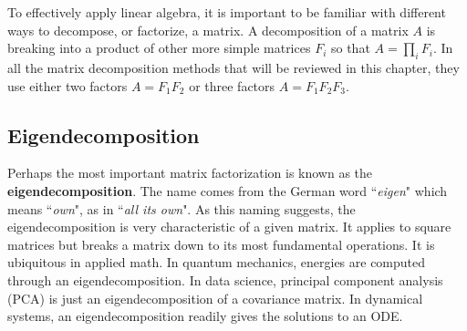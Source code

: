 \documentclass[onecolumn]{gwclass}
\begin{document}
To effectively apply linear algebra, it is important to be familiar with different ways to decompose, or factorize, a matrix. A decomposition of a matrix $A$ is breaking into a product of other more simple matrices $F_i$ so that $A=\prod_i F_i$. In all the matrix decomposition methods that will be reviewed in this chapter, they use either two factors $A=F_1F_2$ or three factors $A=F_1 F_2 F_3$. 

\subsection{Eigendecomposition}
Perhaps the most important matrix factorization is known as the \textbf{eigendecomposition}. The name comes from the German word ``\emph{eigen}" which means ``\emph{own}", as in ``\emph{all its own}". As this naming suggests, the eigendecomposition is very characteristic of a given matrix. It applies to square matrices but breaks a matrix down to its most fundamental operations. It is ubiquitous in applied math. In quantum mechanics, energies are computed through an eigendecomposition. In data science, principal component analysis (PCA) is just an eigendecomposition of a covariance matrix. In dynamical systems, an eigendecomposition readily gives the solutions to an ODE. 
\end{document}
